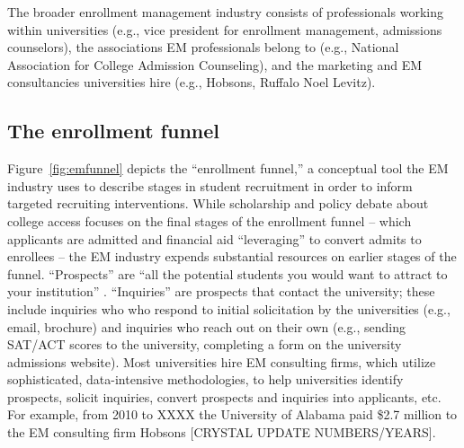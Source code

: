 \documentclass[twoside]{article}
\begin{document}
The broader enrollment management industry consists of professionals working within universities (e.g., vice president for enrollment management, admissions counselors), the associations EM professionals belong to (e.g., National Association for College Admission Counseling), and the marketing and EM consultancies universities hire (e.g., Hobsons, Ruffalo Noel Levitz).

\subsection*{The enrollment funnel}

Figure~\ref{fig:emfunnel} depicts the ``enrollment funnel,'' a conceptual tool the EM industry uses to describe stages in student recruitment in order to inform targeted recruiting interventions.  While scholarship and policy debate about college access focuses on the final stages of the enrollment funnel -- which applicants are admitted \citep[e.g., ][]{RN3536} and financial aid ``leveraging'' to convert admits to enrollees \citep[e.g., ][]{RN1948} -- the EM industry expends substantial resources on earlier stages of the funnel.  ``Prospects'' are ``all the potential students you would want to attract to your institution'' \citep{RN4322}. ``Inquiries'' are prospects that contact the university; these include inquiries who who respond to initial solicitation by the universities (e.g., email, brochure) and inquiries who reach out on their own (e.g., sending SAT/ACT scores to the university, completing a form on the university admissions website).  Most universities hire EM consulting firms, which utilize sophisticated, data-intensive methodologies, to help universities identify prospects, solicit inquiries, convert prospects and inquiries into applicants, etc. For example, from 2010 to XXXX the University of Alabama paid \$2.7 million to the EM consulting firm Hobsons \citep{RN4035}[CRYSTAL UPDATE NUMBERS/YEARS].


\end{document}
